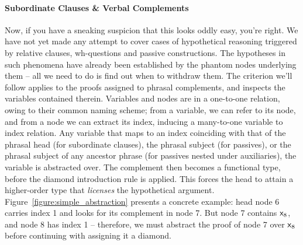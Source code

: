 \paragraph{Subordinate Clauses \& Verbal Complements}
Now, if you have a sneaking suspicion that this looks oddly easy, you're right.
We have not yet made any attempt to cover cases of hypothetical reasoning triggered by relative clauses, wh-questions and passive constructions.
The hypotheses in such phenomena have already been established by the phantom nodes underlying them -- all we need to do is find out when to withdraw them.
The criterion we'll follow applies to the proofs assigned to phrasal complements, and inspects the variables contained therein.
Variables and nodes are in a one-to-one relation, owing to their common naming scheme; from a variable, we can refer to its node, and from a node we can extract its index, inducing a many-to-one variable to index relation.
Any variable that maps to an index coinciding with that of the phrasal head (for subordinate clauses), the phrasal subject (for passives), or the phrasal subject of any ancestor phrase (for passives nested under auxiliaries), the variable is abstracted over.
The complement then becomes a functional type, before the diamond introduction rule is applied.
This forces the head to attain a higher-order type that \textit{licenses} the hypothetical argument.
Figure~\ref{figure:simple_abstraction} presents a concrete example: head node 6 carries index 1 and looks for its complement in node 7.
But node 7 contains $\mathsf{x}_{\mathnormal{8}}$, and node 8 has index 1 -- therefore, we must abstract the proof of node 7 over $\mathsf{x}_{\mathnormal{8}}$ before continuing with assigning it a diamond.

